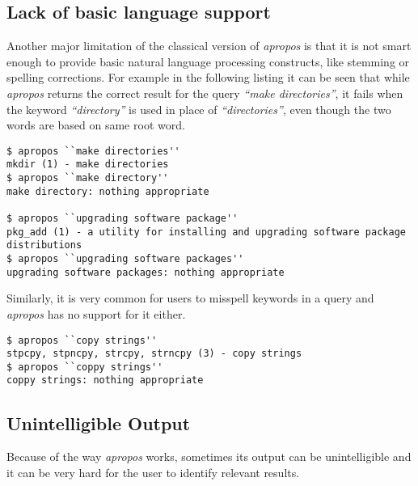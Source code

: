 \documentclass[titlepage, a4paper, 12pt]{article}
\begin{document}
\subsection{Lack of basic language support}
Another major limitation of the classical version of \textit{apropos} is that
it is not smart enough to provide basic natural language processing constructs,
like stemming or spelling corrections.
For example in the following listing it can be seen
that while \textit{apropos} returns the correct result for the query
\textit{``make directories''}, it fails when the keyword \textit{``directory''}
is used in place of \textit{``directories''}, even though the two words are based
on same root word.
\begin{lstlisting}
$ apropos ``make directories''
mkdir (1) - make directories
$ apropos ``make directory''
make directory: nothing appropriate

$ apropos ``upgrading software package''
pkg_add (1) - a utility for installing and upgrading software package
distributions
$ apropos ``upgrading software packages''
upgrading software packages: nothing appropriate
\end{lstlisting}

Similarly, it is very common for users to misspell keywords in a query and \textit{apropos} has no support for it either.
\begin{lstlisting}
$ apropos ``copy strings''
stpcpy, stpncpy, strcpy, strncpy (3) - copy strings
$ apropos ``coppy strings''
coppy strings: nothing appropriate
\end{lstlisting}

\subsection{Unintelligible Output}
Because of the way \textit{apropos} works, sometimes its output can be
unintelligible and it can be very hard for the user to identify relevant results.
\end{document}
